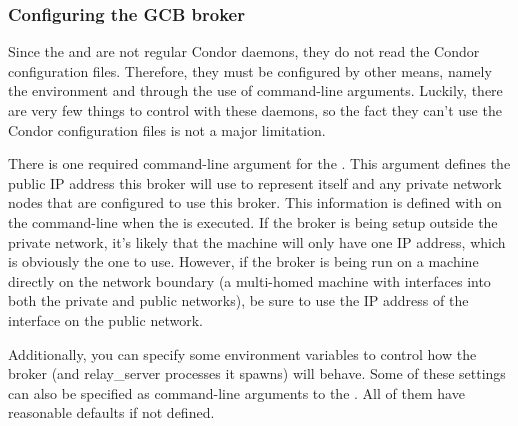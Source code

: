 \subsubsection{\label{sec:GCB-Broker-Config}
Configuring the GCB broker}

Since the  and  are not
regular Condor daemons, they do not read the Condor configuration
files.
Therefore, they must be configured by other means, namely the
environment and through the use of command-line arguments.
Luckily, there are very few things to control with these daemons, so
the fact they can't use the Condor configuration files is not a major
limitation.

There is one required command-line argument for the .
This argument defines the public IP address this broker will use to
represent itself and any private network nodes that are configured to
use this broker.
This information is defined with  on the
command-line when the  is executed.
If the broker is being setup outside the private network, it's likely
that the machine will only have one IP address, which is obviously the
one to use.
However, if the broker is being run on a machine directly on the
network boundary (a multi-homed machine with interfaces into both the
private and public networks), be sure to use the IP address of the
interface on the public network.

Additionally, you can specify some environment variables to control
how the broker (and relay\_server processes it spawns) will behave.
Some of these settings can also be specified as command-line
arguments to the .
All of them have reasonable defaults if not defined.

